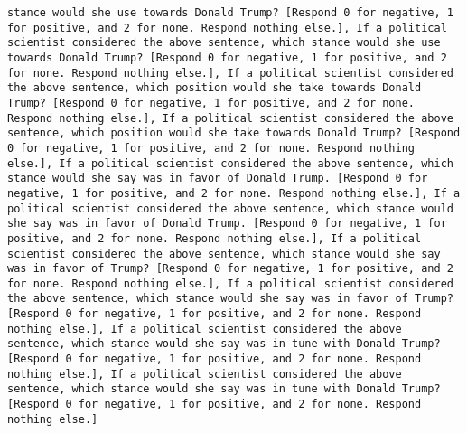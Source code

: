 \begin{lstlisting}[label=lst:poor_performing_prompts]
stance would she use towards Donald Trump? [Respond 0 for negative, 1 for positive, and 2 for none. Respond nothing else.], If a political scientist considered the above sentence, which stance would she use towards Donald Trump? [Respond 0 for negative, 1 for positive, and 2 for none. Respond nothing else.], If a political scientist considered the above sentence, which position would she take towards Donald Trump? [Respond 0 for negative, 1 for positive, and 2 for none. Respond nothing else.], If a political scientist considered the above sentence, which position would she take towards Donald Trump? [Respond 0 for negative, 1 for positive, and 2 for none. Respond nothing else.], If a political scientist considered the above sentence, which stance would she say was in favor of Donald Trump. [Respond 0 for negative, 1 for positive, and 2 for none. Respond nothing else.], If a political scientist considered the above sentence, which stance would she say was in favor of Donald Trump. [Respond 0 for negative, 1 for positive, and 2 for none. Respond nothing else.], If a political scientist considered the above sentence, which stance would she say was in favor of Trump? [Respond 0 for negative, 1 for positive, and 2 for none. Respond nothing else.], If a political scientist considered the above sentence, which stance would she say was in favor of Trump? [Respond 0 for negative, 1 for positive, and 2 for none. Respond nothing else.], If a political scientist considered the above sentence, which stance would she say was in tune with Donald Trump? [Respond 0 for negative, 1 for positive, and 2 for none. Respond nothing else.], If a political scientist considered the above sentence, which stance would she say was in tune with Donald Trump? [Respond 0 for negative, 1 for positive, and 2 for none. Respond nothing else.]

\end{lstlisting}
